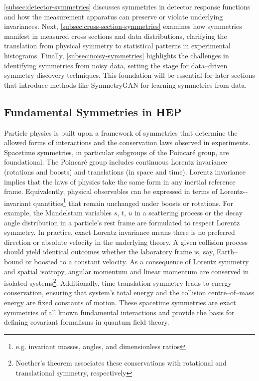     \cref{subsec:detector-symmetries} discusses symmetries in detector response functions and how the measurement apparatus can preserve or violate underlying invariances.
    Next, \cref{subsec:cross-section-symmetries} examines how symmetries manifest in measured cross sections and data distributions, clarifying the translation from physical symmetry to statistical patterns in experimental histograms.
    Finally, \cref{subsec:noisy-symmetries} highlights the challenges in identifying symmetries from noisy data, setting the stage for data--driven symmetry discovery techniques.
    This foundation will be essential for later sections that introduce methods like SymmetryGAN for learning symmetries from data.

    \subsection{Fundamental Symmetries in HEP}
    \label{subsec:hep-symmetries}
        Particle physics is built upon a framework of symmetries that determine the allowed forms of interactions and the conservation laws observed in experiments.
        Spacetime symmetries, in particular subgroups of the Poincaré group, are foundational.
        The Poincaré group includes continuous Lorentz invariance (rotations and boosts) and translations (in space and time).
        Lorentz invariance implies that the laws of physics take the same form in any inertial reference frame.
        Equivalently, physical observables can be expressed in terms of Lorentz-‐invariant quantities\footnote{e.g. invariant masses, angles, and dimensionless ratios} that remain unchanged under boosts or rotations.
        For example, the Mandelstam variables $s$, $t$, $u$ in a scattering process or the decay angle distribution in a particle’s rest frame are formulated to respect Lorentz symmetry.
        In practice, exact Lorentz invariance means there is no preferred direction or absolute velocity in the underlying theory.
        A given collision process should yield identical outcomes whether the laboratory frame is, say, Earth--bound or boosted to a constant velocity.
        As a consequence of Lorentz symmetry and spatial isotropy, angular momentum and linear momentum are conserved in isolated systems\footnote{Noether’s theorem associates these conservations with rotational and translational symmetry, respectively }.
        Additionally, time translation symmetry leads to energy conservation, ensuring that system's total energy and the collision centre--of--mass energy are fixed constants of motion.
        These spacetime symmetries are exact symmetries of all known fundamental interactions and provide the basis for defining covariant formalisms in quantum field theory.

